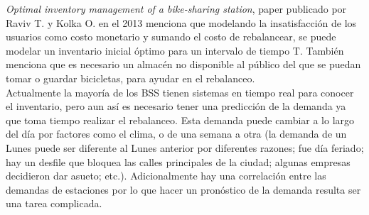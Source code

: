 \documentclass[12pt,spanish]{article}
\begin{document}
 	\textit{Optimal inventory management of a bike-sharing station},  paper publicado por Raviv T. y Kolka O. en el 2013 menciona que modelando la insatisfacción de los usuarios como costo monetario y sumando el costo de rebalancear, se puede modelar un inventario inicial óptimo para un intervalo de tiempo T. También menciona que es necesario un almacén no disponible al público del que se puedan tomar o guardar bicicletas, para ayudar en el rebalanceo.\\
 	Actualmente la mayoría de los BSS tienen sistemas en tiempo real para conocer el inventario, pero aun así es necesario tener una predicción de la demanda ya que toma tiempo realizar el rebalanceo. Esta demanda puede cambiar a lo largo del día por factores como el clima, o de una semana a otra (la demanda de un Lunes puede ser diferente al Lunes anterior por diferentes razones; fue día feriado; hay un desfile que bloquea las calles principales de la ciudad; algunas empresas decidieron dar asueto; etc.). Adicionalmente hay una correlación entre las demandas de estaciones por lo que hacer un pronóstico de la demanda resulta ser una tarea complicada.
\end{document}
